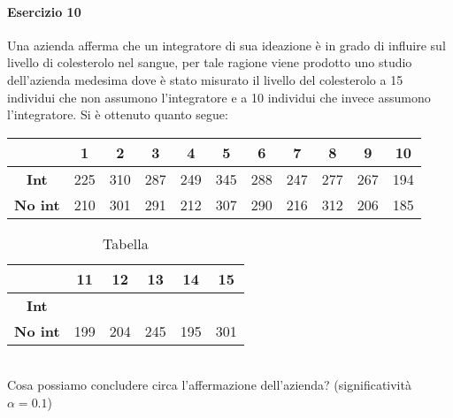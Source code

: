 \documentclass[12pt]{article}
\begin{document}
    \paragraph{Esercizio 10}
    Una azienda afferma che un integratore di sua ideazione è in grado di influire sul livello di colesterolo nel sangue, per tale ragione viene prodotto uno studio dell’azienda medesima dove è stato misurato il livello del colesterolo a 15 individui che non assumono l’integratore e a 10 individui che invece assumono l’integratore. Si è ottenuto quanto segue:
    \begin{table}[!htb]
        \centering
        \begin{tabular}{c|c|c|c|c|c|c|c|c|c|c|}
        \cline{2-11}
        \multicolumn{1}{l|}{}                 & \textbf{1} & \textbf{2} & \textbf{3} & \textbf{4} & \textbf{5} & \textbf{6} & \textbf{7} & \textbf{8} & \textbf{9} & \textbf{10} \\ \hline
        \multicolumn{1}{|c|}{\textbf{Int}}    & 225        & 310        & 287        & 249        & 345        & 288        & 247        & 277        & 267        & 194         \\ \hline
        \multicolumn{1}{|c|}{\textbf{No int}} & 210        & 301        & 291        & 212        & 307        & 290        & 216        & 312        & 206        & 185         \\ \hline
        \end{tabular}
        \label{tab:my-table10}
    \end{table}
    \begin{table}[!htb]
        \centering
        \begin{tabular}{c|c|c|c|c|c|}
        \cline{2-6}
        \multicolumn{1}{l|}{}                 & \textbf{11} & \textbf{12} & \textbf{13} & \textbf{14} & \textbf{15} \\ \hline
        \multicolumn{1}{|c|}{\textbf{Int}}    &             &             &             &             &             \\ \hline
        \multicolumn{1}{|c|}{\textbf{No int}} & 199         & 204         & 245         & 195         & 301         \\ \hline
        \end{tabular}
        \caption{Tabella}
        \label{tab:my-table11}
        \end{table}
    \\Cosa possiamo concludere circa l’affermazione dell’azienda? (significatività $\alpha=0.1$)
\end{document}
